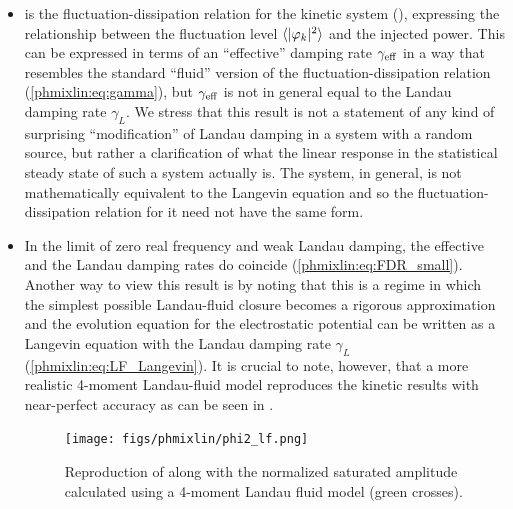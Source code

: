 \begin{itemize}

\item {} is the fluctuation-dissipation relation for the kinetic system (), 
expressing the relationship between the fluctuation level $\langle|\varphi_k|^2\rangle$ 
and the injected power. This can be expressed in terms of an ``effective'' 
damping rate $\gamma_{\rm eff}$ in a way that resembles the standard ``fluid'' version 
of the fluctuation-dissipation relation (\eqref{phmixlin:eq:gamma}), but $\gamma_{\rm eff}$ is not in general equal to the 
Landau damping rate $\gamma_L$. We stress that this result is not a statement 
of any kind of surprising ``modification'' of Landau damping in a system with 
a random source, but rather a clarification of what the linear response 
in the statistical steady state of such a system actually is. The system, in general, 
is not mathematically equivalent to the Langevin equation 
and so the fluctuation-dissipation relation for it need not have the same form. 

\item In the limit of zero real frequency and weak Landau damping, the 
effective and the Landau damping rates do coincide (\eqref{phmixlin:eq:FDR_small}). 
Another way to view this result is by noting that 
this is a regime in which the simplest possible Landau-fluid closure 
becomes a rigorous approximation and the evolution equation for the 
electrostatic potential can be written as a Langevin equation with 
the Landau damping rate $\gamma_L$ (\eqref{phmixlin:eq:LF_Langevin}). It is crucial to
note, however, that a more realistic 4-moment Landau-fluid model reproduces the kinetic
results with near-perfect accuracy as can be seen in .

\begin{figure}
\begin{center}
\texttt{[image: figs/phmixlin/phi2\_lf.png]}
\caption{Reproduction of  along with the normalized saturated
amplitude calculated using a 4-moment Landau fluid model (green crosses).}
\label{phmixlin:fig:LF}
\end{center}
\end{figure}


\end{itemize}
